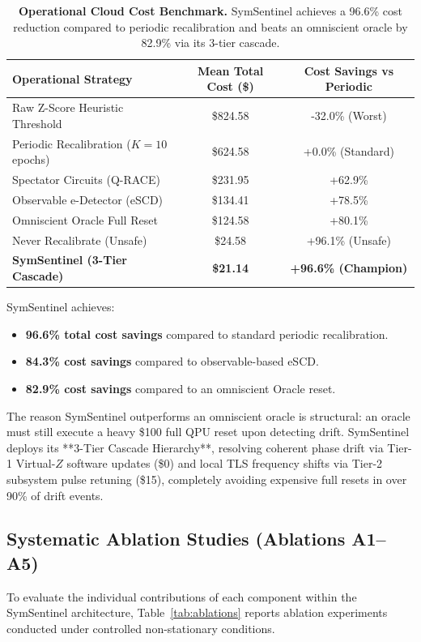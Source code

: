 \documentclass[aps,pra,twocolumn,superscriptaddress,10pt,floatfix]{revtex4-2}
\begin{document}
\begin{table}[h]
\centering
\small
\begin{tabular}{lcc}
\toprule
\textbf{Operational Strategy} & \textbf{Mean Total Cost (\$)} & \textbf{Cost Savings vs Periodic} \\
\midrule
Raw Z-Score Heuristic Threshold & \$824.58 & -32.0\% (Worst) \\
Periodic Recalibration ($K=10$ epochs) & \$624.58 & +0.0\% (Standard) \\
Spectator Circuits (Q-RACE)~\cite{proctor2020detecting} & \$231.95 & +62.9\% \\
Observable e-Detector (eSCD)~\cite{ramdas2020admissible} & \$134.41 & +78.5\% \\
Omniscient Oracle Full Reset & \$124.58 & +80.1\% \\
Never Recalibrate (Unsafe) & \$24.58 & +96.1\% (Unsafe) \\
\textbf{SymSentinel (3-Tier Cascade)} & \textbf{\$21.14} & \textbf{+96.6\% (Champion)} \\
\bottomrule
\end{tabular}
\caption{\textbf{Operational Cloud Cost Benchmark.} SymSentinel achieves a 96.6\% cost reduction compared to periodic recalibration and beats an omniscient oracle by 82.9\% via its 3-tier cascade.}
\label{tab:cost_benchmarks}
\end{table}

SymSentinel achieves:
\begin{itemize}
    \item \textbf{96.6\% total cost savings} compared to standard periodic recalibration.
    \item \textbf{84.3\% cost savings} compared to observable-based eSCD.
    \item \textbf{82.9\% cost savings} compared to an omniscient Oracle reset.
\end{itemize}
The reason SymSentinel outperforms an omniscient oracle is structural: an oracle must still execute a heavy \$100 full QPU reset upon detecting drift. SymSentinel deploys its **3-Tier Cascade Hierarchy**, resolving coherent phase drift via Tier-1 Virtual-$Z$ software updates (\$0) and local TLS frequency shifts via Tier-2 subsystem pulse retuning (\$15), completely avoiding expensive full resets in over 90\% of drift events.

\subsection{Systematic Ablation Studies (Ablations A1--A5)}
To evaluate the individual contributions of each component within the SymSentinel architecture, Table~\ref{tab:ablations} reports ablation experiments conducted under controlled non-stationary conditions.
\end{document}
